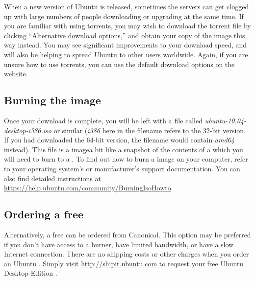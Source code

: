 When a new version of Ubuntu is released, sometimes the \glspl{server} can get clogged up with large numbers of people downloading or upgrading at the same time. If you are familiar with using torrents, you may wish to download the torrent file by clicking ``Alternative download options,'' and obtain your copy of the  image this way instead. You may see significant improvements to your download speed, and will also be helping to spread Ubuntu to other users worldwide. Again, if you are unsure how to use torrents, you can use the default download options on the website. 

\subsection{Burning the  image}
Once your download is complete, you will be left with a file called \emph{ubuntu-10.04-desktop-i386.iso} or similar (\emph{i386} here in the filename refers to the 32-bit version. If you had downloaded the 64-bit version, the filename would contain \emph{amd64} instead). This file is a  image\dash a bit like a snapshot of the contents of a \dash which you will need to burn to a . To find out how to burn a  image on your computer, refer to your operating system's or manufacturer's support documentation. You can also find detailed instructions at \url{https://help.ubuntu.com/community/BurningIsoHowto}.

\subsection{Ordering a free }

Alternatively, a free  can be ordered from Canonical. This option may be preferred if you don't have access to a  burner, have limited bandwidth, or have a slow Internet connection. There are no shipping costs or other charges when you order an Ubuntu . Simply visit \url{http://shipit.ubuntu.com} to request your free Ubuntu Desktop Edition .

